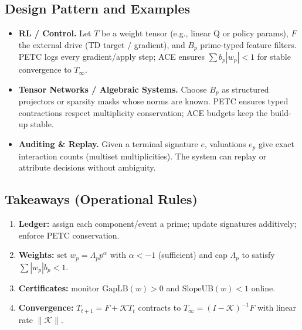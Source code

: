 \documentclass[11pt]{article}
\theoremstyle{plain}
\theoremstyle{definition}
\theoremstyle{remark}
\begin{document}
\subsection{Design Pattern and Examples}
\begin{itemize}
  \item \textbf{RL / Control.} Let $T$ be a weight tensor (e.g., linear Q or policy params), $F$ the external drive
        (TD target / gradient), and $B_p$ prime-typed feature filters. PETC logs every gradient/apply step; ACE ensures
        $\sum b_p |w_p| < 1$ for stable convergence to $T_\infty$.
  \item \textbf{Tensor Networks / Algebraic Systems.} Choose $B_p$ as structured projectors or sparsity masks whose norms
        are known. PETC ensures typed contractions respect multiplicity conservation; ACE budgets keep the build-up stable.
  \item \textbf{Auditing \& Replay.} Given a terminal signature $e$, valuations $e_p$ give exact interaction counts
        (multiset multiplicities). The system can replay or attribute decisions without ambiguity.
\end{itemize}

\subsection{Takeaways (Operational Rules)}
\begin{enumerate}
  \item \textbf{Ledger:} assign each component/event a prime; update signatures additively; enforce PETC conservation.
  \item \textbf{Weights:} set $w_p=\Lambda_p p^\alpha$ with $\alpha< -1$ (sufficient) and cap $\Lambda_p$ to satisfy
        $\sum |w_p| b_p < 1$.
  \item \textbf{Certificates:} monitor $\mathrm{GapLB}(w)>0$ and $\mathrm{SlopeUB}(w)<1$ online.
  \item \textbf{Convergence:} $T_{t+1}=F+\mathcal{K}T_t$ contracts to $T_\infty=(I-\mathcal{K})^{-1}F$ with linear rate $\|\mathcal{K}\|$.
\end{enumerate}


\nocite{*}


\end{document}
